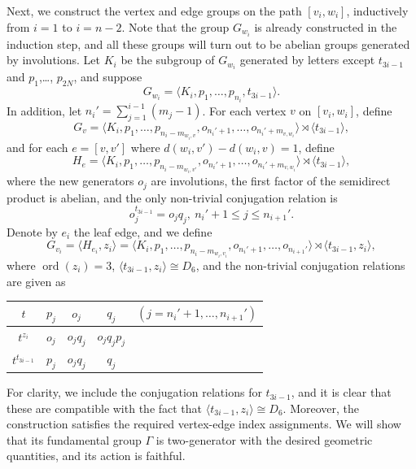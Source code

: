 \documentclass[12pt,leqno]{amsart}
\newcommand{\2}{L^2_{\rm per}(0, T)}
\newcommand{\ord}{{\operatorname{ord}}}
\numberwithin{equation}{section}
\numberwithin{figure}{section}
\begin{document}
Next, we construct the vertex and edge groups on the path $[v_i,w_i]$, inductively from $i=1$ to $i=n-2$. Note that the group $G_{w_i}$ is already constructed in the induction step, and all these groups will turn out to be abelian groups generated by involutions. Let $K_i$ be the subgroup of $G_{w_i}$ generated by letters except $t_{3i-1}$ and $p_1$,\dots, $p_{2N}$, and suppose
\[
G_{w_i} = \langle K_i, p_1,\dots, p_{n_i},t_{3i-1}\rangle.
\]
In addition, let $n_i' = \sum_{j=1}^{i-1}(m_j-1)$. For each vertex $v$ on $[v_i,w_i]$, define
\[
G_v = \langle K_i, p_1,\dots, p_{n_i - m_{w_i,v}},o_{n_i'+1},\dots, o_{n_i'+m_{v,w_i}}\rangle\rtimes \langle t_{3i-1}\rangle,
\]
and for each $e = [v,v']$ where $d(w_i,v') - d(w_i,v) = 1$, define
\[
H_e = \langle K_i, p_1,\dots, p_{n_i - m_{w_i,v'}},o_{n_i'+1},\dots, o_{n_i'+m_{v,w_i}}\rangle\rtimes \langle t_{3i-1}\rangle,
\]
where the new generators $o_j$ are involutions, the first factor of the semidirect product is abelian, and the only non-trivial conjugation relation is
\[
o_j^{t_{3i-1}} = o_jq_j,\ n_i'+1\leq j\leq n_{i+1}'.
\]
Denote by $e_{i}$ the leaf edge, and we define
\[
G_{v_i} = \langle H_{e_i},z_i\rangle = \langle K_i, p_1,\dots, p_{n_i - m_{w_i,v_i}},o_{n_i'+1},\dots, o_{n_{i+1}'}\rangle\rtimes \langle t_{3i-1},z_i\rangle,
\]
where $\ord(z_i) = 3$, $\langle t_{3i-1},z_i\rangle\cong D_6$, and the non-trivial conjugation relations are given as
\begin{center}
    \begin{tabular}{c||c|c|cc}
        $t$ & $p_j$ & $o_j$ & $q_j$ & $(j=n_i'+1,\dots,n_{i+1}')$ \\
        \hline
        $t^{z_i}$ & $o_j$ & $o_jq_j$ & $o_jq_jp_j$ \\
        \hline
        $t^{t_{3i-1}}$ & $p_j$ & $o_jq_j$ & $q_j$
    \end{tabular}
\end{center}
For clarity, we include the conjugation relations for $t_{3i-1}$, and it is clear that these are compatible with the fact that $\langle t_{3i-1},z_i\rangle\cong D_6$. Moreover, the construction satisfies the required vertex-edge index assignments. We will show that its fundamental group $\Gamma$ is two-generator with the desired geometric quantities, and its action is faithful.
\end{document}
